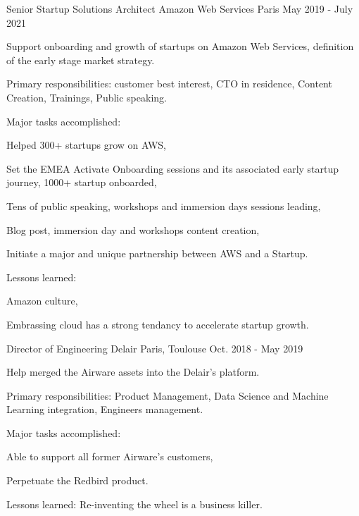 \begin{cventries}
  \cventry
    {Senior Startup Solutions Architect} %
    {Amazon Web Services} %
    {Paris} %
    {May 2019 - July 2021} %
    {
      \begin{cvitems} %
        \item {Support onboarding and growth of startups on Amazon Web Services, definition of the early stage market strategy.}
        \item {Primary responsibilities: customer best interest, CTO in residence, Content Creation, Trainings, Public speaking.}
        \item {Major tasks accomplished:}
        \begin{cvsubitems}
          \item {Helped 300+ startups grow on AWS,}
          \item {Set the EMEA Activate Onboarding sessions and its associated early startup journey, 1000+ startup onboarded,}
          \item {Tens of public speaking, workshops and immersion days sessions leading,}
          \item {Blog post, immersion day and workshops content creation,}
          \item {Initiate a major and unique partnership between AWS and a Startup.}
        \end{cvsubitems}
        \item {Lessons learned:}
        \begin{cvsubitems}
          \item {Amazon culture,}
          \item {Embrassing cloud has a strong tendancy to accelerate startup growth.}
        \end{cvsubitems}
      \end{cvitems}
    }

  \cventry
    {Director of Engineering} %
    {Delair} %
    {Paris, Toulouse} %
    {Oct. 2018 - May 2019} %
    {
      \begin{cvitems} %
        \item {Help merged the Airware assets into the Delair's platform.}
        \item {Primary responsibilities: Product Management, Data Science and Machine Learning integration, Engineers management.}
        \item {Major tasks accomplished:}
        \begin{cvsubitems}
          \item {Able to support all former Airware's customers,}
          \item {Perpetuate the Redbird product.}
        \end{cvsubitems}
        \item {Lessons learned: Re-inventing the wheel is a business killer.}
      \end{cvitems}
    }


\end{cventries}
